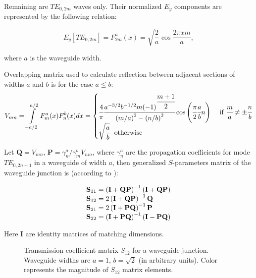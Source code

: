 \documentclass{pj}
\begin{document}
Remaining are $TE_{0, 2m}$ waves only. Their
normalized $E_{y}$ components are represented by the following
relation:

\begin{equation}
  \label{eq:eigen_functions}
  E_y[TE_{0, 2m}] = F_{2m}^a(x) = \sqrt{\frac{2}{a}} \cos{\frac{2 \pi x m}{a}},
\end{equation}

where $a$ is the waveguide width. 

Overlapping matrix used to calculate reflection between adjacent
sections of widths $a$ and $b$ is for the case $a \le b$:
\begin{equation}
  \label{eq:overlapping}
  V_{mn} = \int\limits_{-a/2}^{a/2}F_m^a(x) F_n^b(x) dx =
  \begin{cases}
    \cfrac{4}{\pi} \cfrac{a^{-3/2} b^{-1/2} m
      (-1)^{\cfrac{m+1}{2}}}{\left(m/a\right)^2 -
      \left(n/b\right)^2} \cos{\left(\cfrac{\pi}{2}\cfrac{a}{b}n\right)}& \text{ if }\cfrac{m}{a} \ne \pm \cfrac{n}{b} \\
    \sqrt{\cfrac{a}{b}}~\text{ otherwise}
  \end{cases}
\end{equation}

Let $\mathbf{Q} = V_{mn}$,
$\mathbf{P} = \gamma_n^a/\gamma_m^b V_{nm}$, where $\gamma_n^a$ are
the propagation coefficients for mode $TE_{0, 2n+1}$ in a waveguide of
width $a$, then generalized $S$-parameters matrix of the waveguide
junction is (according to \cite{conciauro2000advanced}):

\begin{equation}
  \label{eq:s_matrix}
  \begin{array}{r@{}l}
    \mathbf{S}_{11} &{}= \left(\mathbf{I} + \mathbf{Q P}\right)^{-1} \left(\mathbf{I} + \mathbf{Q P}\right) \\
    \mathbf{S}_{12} &{}= 2\left(\mathbf{I} + \mathbf{Q P}\right)^{-1}\mathbf{Q} \\
    \mathbf{S}_{21} &{}= 2\left(\mathbf{I} + \mathbf{P Q}\right)^{-1}\mathbf{P} \\
    \mathbf{S}_{22} &{}= \left(\mathbf{I} + \mathbf{P Q}\right)^{-1}\left(\mathbf{I} - \mathbf{P Q}\right)
  \end{array}
\end{equation}

Here $\mathbf{I}$ are identity matrices of matching dimensions.

\begin{figure}
  
  \caption{Transmission coefficient matrix $S_{12}$ for a waveguide
    junction. Waveguide widths are $a=1$, $b=\sqrt{2}$ (in arbitrary
    units). Color represents the magnitude of $S_{12}$ matrix elements.}
  \label{fig:s12_matrix}
\end{figure}
\end{document}
